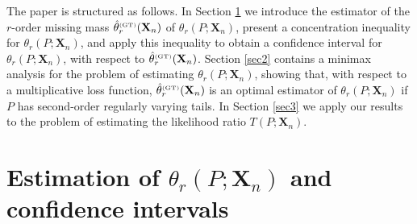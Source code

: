 \documentclass{article}
\newcommand{\1}{\boldsymbol{1}}
\theoremstyle{plain}
\begin{document}
The paper is structured as follows. In Section \ref{sec1} we introduce the estimator of the $r$-order missing mass $\hat{\theta}_{r}^{\text{\tiny{(GT)}}}(\mathbf{X}_{n})$ of $\theta_{r}(P;\mathbf{X}_{n})$, present a concentration inequality for $\theta_r(P;\mathbf{X}_{n})$, and apply this inequality to obtain a confidence interval for $\theta_r(P;\mathbf{X}_{n})$, with respect to $\hat{\theta}_{r}^{\text{\tiny{(GT)}}}(\mathbf{X}_{n})$. Section \ref{sec2} contains a minimax analysis for the problem of estimating $\theta_{r}(P;\mathbf{X}_{n})$, showing that, with respect to a multiplicative loss function, $\hat{\theta}_{r}^{\text{\tiny{(GT)}}}(\mathbf{X}_{n})$ is an optimal estimator of $\theta_r(P;\mathbf{X}_{n})$ if $P$ has second-order regularly varying tails. In Section \ref{sec3} we apply our results to the problem of estimating the likelihood ratio $T(P;\mathbf{X}_{n})$.


\section{Estimation of $\theta_{r}(P;\mathbf{X}_{n})$ and confidence intervals}\label{sec1}
\end{document}
